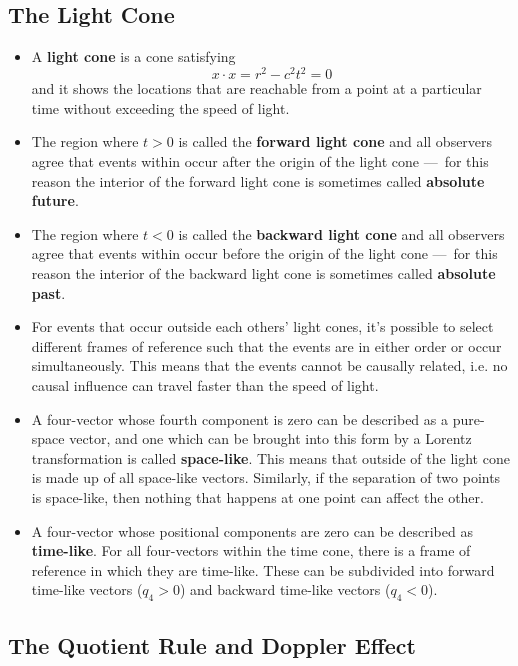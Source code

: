 \documentclass{article}
\begin{document}
\subsection{The Light Cone}

\begin{itemize}
  \item A \textbf{light cone} is a cone satisfying \[x \cdot x = r^2 - c^2 t^2 = 0\] and it shows the locations that are reachable from a point at a particular time without exceeding the speed of light.

  \item The region where $t > 0$ is called the \textbf{forward light cone} and all observers agree that events within occur after the origin of the light cone — for this reason the interior of the forward light cone is sometimes called \textbf{absolute future}.

  \item The region where $t < 0$ is called the \textbf{backward light cone} and all observers agree that events within occur before the origin of the light cone — for this reason the interior of the backward light cone is sometimes called \textbf{absolute past}.

  \item For events that occur outside each others' light cones, it's possible to select different frames of reference such that the events are in either order or occur simultaneously. This means that the events cannot be causally related, i.e. no causal influence can travel faster than the speed of light.

  \item A four-vector whose fourth component is zero can be described as a pure-space vector, and one which can be brought into this form by a Lorentz transformation is called \textbf{space-like}. This means that outside of the light cone is made up of all space-like vectors. Similarly, if the separation of two points is space-like, then nothing that happens at one point can affect the other.

  \item A four-vector whose positional components are zero can be described as \textbf{time-like}. For all four-vectors within the time cone, there is a frame of reference in which they are time-like. These can be subdivided into forward time-like vectors ($q_4 > 0$) and backward time-like vectors ($q_4 < 0$).
\end{itemize}

\subsection{The Quotient Rule and Doppler Effect}
\end{document}

